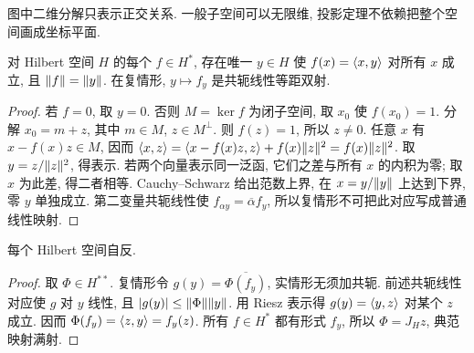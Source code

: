 \begin{center}
\end{center}
图中二维分解只表示正交关系. 一般子空间可以无限维, 投影定理不依赖把整个空间画成坐标平面.

\begin{theorem}\label{thm:riesz}
对 Hilbert 空间 $H$ 的每个 $f\in H^*$, 存在唯一 $y\in H$ 使 $f(x)=\langle x,y\rangle$ 对所有 $x$ 成立, 且 $\lVert f\rVert=\lVert y\rVert$. 在复情形, $y\mapsto f_y$ 是共轭线性等距双射.
\end{theorem}
\begin{proof}
若 $f=0$, 取 $y=0$. 否则 $M=\ker f$ 为闭子空间, 取 $x_0$ 使 $f(x_0)=1$. 分解 $x_0=m+z$, 其中 $m\in M$, $z\in M^\perp$. 则 $f(z)=1$, 所以 $z\ne0$. 任意 $x$ 有 $x-f(x)z\in M$, 因而
$\langle x,z\rangle=\langle x-f(x)z,z\rangle+f(x)\lVert z\rVert^2=f(x)\lVert z\rVert^2$.
取 $y=z/\lVert z\rVert^2$, 得表示. 若两个向量表示同一泛函, 它们之差与所有 $x$ 的内积为零; 取 $x$ 为此差, 得二者相等. Cauchy--Schwarz 给出范数上界, 在 $x=y/\lVert y\rVert$ 上达到下界, 零 $y$ 单独成立. 第二变量共轭线性使 $f_{\alpha y}=\overline\alpha f_y$, 所以复情形不可把此对应写成普通线性映射.
\end{proof}

\begin{proposition}\label{prop:hilbert-reflexive}
每个 Hilbert 空间自反.
\end{proposition}
\begin{proof}
取 $\Phi\in H^{**}$. 复情形令 $g(y)=\overline{\Phi(f_y)}$, 实情形无须加共轭. 前述共轭线性对应使 $g$ 对 $y$ 线性, 且 $|g(y)|\le\lVert \Phi\rVert\lVert y\rVert$. 用 Riesz 表示得 $g(y)=\langle y,z\rangle$ 对某个 $z$ 成立. 因而 $\Phi(f_y)=\langle z,y\rangle=f_y(z)$. 所有 $f\in H^*$ 都有形式 $f_y$, 所以 $\Phi=J_Hz$, 典范映射满射.
\end{proof}

